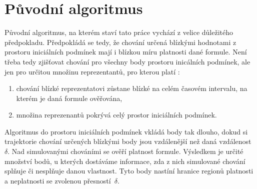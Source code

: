 \section{Původní algoritmus}

Původní algoritmus, na kterém staví tato práce vychází z velice důležitého předpokladu.
 Předpokládá se tedy, že chování určená blízkými
hodnotami z prostoru iniciálních podmínek mají i blízkou míru platnosti dané formule.
Není třeba tedy zjišťovat chování pro všechny body prostoru inicálních podmínek,
ale jen pro určitou množinu reprezentantů, pro kterou platí \cite[str. 25]{drazan2011}:

\begin{enumerate}
	\item	chování blízké reprezentatovi zůstane blízké na celém časovém intervalu,
			na kterém je daná formule ověřována,
	\item	množina reprezenantů pokrývá celý prostor iniciálních podmínek.
\end{enumerate}

Algoritmus do prostoru iniciálních podmínek vkládá body tak dlouho, dokud si trajektorie chování
určených blízkými body jsou vzdálenější než daná vzdálenost $\delta$. Nad simulovanými chováními
se ověří platnost formule. Výsledkem je určité množství bodů, u kterých dostáváme informace,
zda z nich simulované chování splňuje či nesplňuje danou vlastnost. Tyto body nastíní
hranice regionů platnosti a neplatnosti se zvolenou přes\-nos\-tí~$\delta$.

